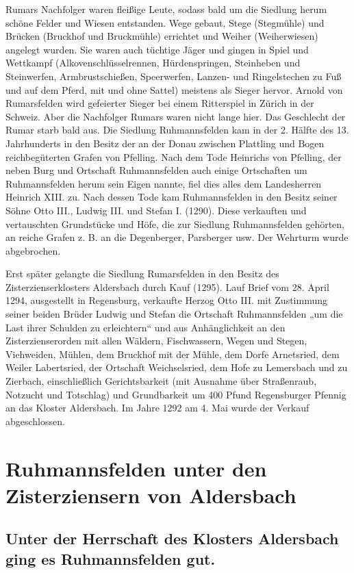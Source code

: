 \documentclass[12pt,a4paper]{book}
\begin{document}
Rumars Nachfolger waren fleißige Leute, sodass bald um die Siedlung herum schöne
Felder und Wiesen entstanden. Wege gebaut, Stege (Stegmühle) und Brücken
(Bruckhof und Bruckmühle) errichtet und Weiher (Weiherwiesen) angelegt wurden.
Sie waren auch tüchtige Jäger und gingen in Spiel und Wettkampf
(Alkovenschlüsselrennen, Hürdenspringen, Steinheben und Steinwerfen,
Armbrustschießen, Speerwerfen, Lanzen- und Ringelstechen zu Fuß und auf dem
Pferd, mit und ohne Sattel) meistens als Sieger hervor. Arnold von Rumarsfelden
wird gefeierter Sieger bei einem Ritterspiel in Zürich in der Schweiz. Aber die
Nachfolger Rumars waren nicht lange hier. Das Geschlecht der Rumar starb bald
aus. Die Siedlung Ruhmannsfelden kam in der 2. Hälfte des 13. Jahrhunderts in
den Besitz der an der Donau zwischen Plattling und Bogen reichbegüterten Grafen
von Pfelling. Nach dem Tode Heinrichs von Pfelling, der neben Burg und Ortschaft
Ruhmannsfelden auch einige Ortschaften um Ruhmannsfelden herum sein Eigen
nannte, fiel dies alles dem Landesherren Heinrich XIII. zu. Nach dessen Tode kam
Ruhmannsfelden in den Besitz seiner Söhne Otto III., Ludwig III. und Stefan I.
(1290). Diese verkauften und vertauschten Grundstücke und Höfe, die zur Siedlung
Ruhmannsfelden gehörten, an reiche Grafen z. B. an die Degenberger, Parsberger
usw. Der Wehrturm wurde abgebrochen.

Erst später gelangte die Siedlung Rumarsfelden in den Besitz des
Zisterzienserklosters Aldersbach durch Kauf (1295). Lauf Brief vom 28. April
1294, ausgestellt in Regensburg, verkaufte Herzog Otto III. mit Zustimmung
seiner beiden Brüder Ludwig und Stefan die Ortschaft Ruhmannsfelden „um die Last
ihrer Schulden zu erleichtern“ und aus Anhänglichkeit an den Zisterzienserorden
mit allen Wäldern, Fischwassern, Wegen und Stegen, Viehweiden, Mühlen, dem
Bruckhof mit der Mühle, dem Dorfe Arnetsried, dem Weiler Labertsried, der
Ortschaft Weichselsried, dem Hofe zu Lemersbach und zu Zierbach, einschließlich
Gerichtsbarkeit (mit Ausnahme über Straßenraub, Notzucht und Totschlag) und
Grundbarkeit um 400 Pfund Regensburger Pfennig an das Kloster Aldersbach. Im
Jahre 1292 am 4. Mai wurde der Verkauf abgeschlossen.

\chapter{Ruhmannsfelden unter den Zisterziensern von Aldersbach}

\section{Unter der Herrschaft des Klosters Aldersbach ging es Ruhmannsfelden gut.}
\end{document}
